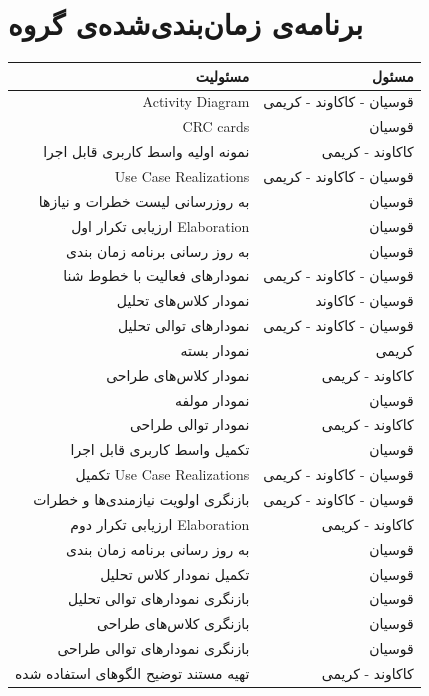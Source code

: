 \documentclass{article}
\begin{document}


\newpage
\section{برنامه‌ی زمان‌بندی‌شده‌ی گروه‌}

\begin{tabular}{ | r | r | }
\hline
	مسئولیت & مسئول \\ \hline
	Activity Diagram &قوسیان - کاکاوند - کریمی \\ \hline
	CRC cards & قوسیان \\ \hline
	نمونه اولیه واسط کاربری قابل اجرا & کاکاوند - کریمی \\ \hline
	Use Case Realizations & قوسیان - کاکاوند - کریمی \\ \hline
	به روزرسانی لیست خطرات و نیازها & قوسیان \\ \hline
	ارزیابی تکرار اول Elaboration  & قوسیان \\ \hline
	به روز رسانی برنامه زمان بندی  & قوسیان \\ \hline
	نمودارهای فعالیت با خطوط شنا & قوسیان - کاکاوند - کریمی \\ \hline
	نمودار کلاس‌های تحلیل &قوسیان - کاکاوند  \\ \hline
	نمودارهای توالی تحلیل & قوسیان - کاکاوند - کریمی \\ \hline
	نمودار بسته & کریمی \\ \hline
	نمودار کلاس‌های طراحی & کاکاوند - کریمی \\ \hline
	نمودار مولفه & قوسیان \\ \hline
	نمودار توالی طراحی & کاکاوند - کریمی \\ \hline
	تکمیل واسط کاربری قابل اجرا & قوسیان \\ \hline
	تکمیل Use Case Realizations & قوسیان - کاکاوند - کریمی \\ \hline
	بازنگری اولویت‌ نیازمندی‌ها و خطرات & قوسیان - کاکاوند - کریمی \\ \hline
	ارزیابی تکرار دوم Elaboration  & کاکاوند - کریمی \\ \hline
	به روز رسانی برنامه زمان بندی  & قوسیان \\ \hline
	تکمیل نمودار کلاس‌ تحلیل & قوسیان \\ \hline
	بازنگری نمودارهای توالی تحلیل & قوسیان \\ \hline
	بازنگری کلاس‌های طراحی & قوسیان \\ \hline
	بازنگری نمودارهای توالی طراحی & قوسیان \\ \hline
	تهیه مستند توضیح الگوهای استفاده شده & کاکاوند - کریمی \\ \hline

\end{tabular}
\end{document}
